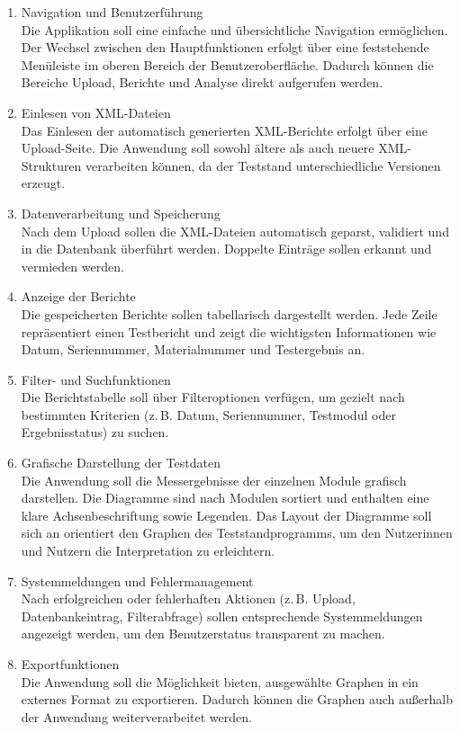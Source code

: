 \begin{enumerate}
  \item Navigation und Benutzerführung \\
  Die Applikation soll eine einfache und übersichtliche Navigation ermöglichen.
  Der Wechsel zwischen den Hauptfunktionen erfolgt über eine feststehende Menüleiste im oberen Bereich der Benutzeroberfläche.
  Dadurch können die Bereiche Upload, Berichte und Analyse direkt aufgerufen werden.

  \item Einlesen von XML-Dateien \\
  Das Einlesen der automatisch generierten XML-Berichte erfolgt über eine Upload-Seite.
  Die Anwendung soll sowohl ältere als auch neuere XML-Strukturen verarbeiten können, da der Teststand unterschiedliche Versionen erzeugt.

  \item Datenverarbeitung und Speicherung \\
  Nach dem Upload sollen die XML-Dateien automatisch geparst, validiert und in die Datenbank überführt werden.
  Doppelte Einträge sollen erkannt und vermieden werden.

  \item Anzeige der Berichte \\
  Die gespeicherten Berichte sollen tabellarisch dargestellt werden.
  Jede Zeile repräsentiert einen Testbericht und zeigt die wichtigsten Informationen wie Datum, Seriennummer, Materialnummer und Testergebnis an.

  \item Filter- und Suchfunktionen \\
  Die Berichtstabelle soll über Filteroptionen verfügen, um gezielt nach bestimmten Kriterien
  (z.\,B. Datum, Seriennummer, Testmodul oder Ergebnisstatus) zu suchen.

  \item Grafische Darstellung der Testdaten \\
  Die Anwendung soll die Messergebnisse der einzelnen Module grafisch darstellen.
  Die Diagramme sind nach Modulen sortiert und enthalten eine klare Achsenbeschriftung sowie Legenden.
  Das Layout der Diagramme soll sich an orientiert den Graphen des Teststandprogramms, um den Nutzerinnen und Nutzern die Interpretation zu erleichtern.

  \item Systemmeldungen und Fehlermanagement \\
  Nach erfolgreichen oder fehlerhaften Aktionen (z.\,B. Upload, Datenbankeintrag, Filterabfrage) sollen entsprechende Systemmeldungen angezeigt werden, um den Benutzerstatus transparent zu machen.

  \item Exportfunktionen \\
  Die Anwendung soll die Möglichkeit bieten, ausgewählte Graphen in ein externes Format zu exportieren.
  Dadurch können die Graphen auch außerhalb der Anwendung weiterverarbeitet werden.
\end{enumerate}

